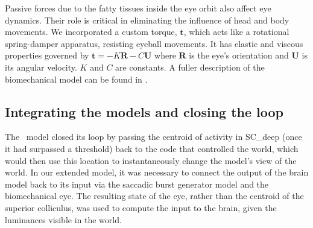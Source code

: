 \documentclass{frontiersSCNS}
\begin{document}
Passive forces due to the fatty tissues inside the eye orbit also
affect eye dynamics. Their role is critical in eliminating the
influence of head and body movements. We incorporated a custom torque, $\mathbf{t}$,
which acts like a rotational spring-damper apparatus, resisting
eyeball movements. It has elastic and viscous properties governed by
$\mathbf{t} = -K\mathbf{R}-C\mathbf{U}$ where $\mathbf{R}$ is the
eye's orientation and $\mathbf{U}$ is its angular velocity. $K$ and
$C$ are constants. A fuller description of the biomechanical model 
can be found in \cite{papapavlou_physics-based_2014}.

\subsection{Integrating the models and closing the loop}

The \ccg~model closed its loop by passing the centroid of activity in
SC\_deep (once it had surpassed a threshold) back to the code that
controlled the world, which would then use this location to
instantaneously change the model's view of the world. In our extended
model, it was necessary to connect the output of the brain model back
to its input via the saccadic burst generator model and the
biomechanical eye. The resulting state of the eye, rather than the
centroid of the superior colliculus, was used to compute the input to
the brain, given the luminances visible in the world.
\end{document}
